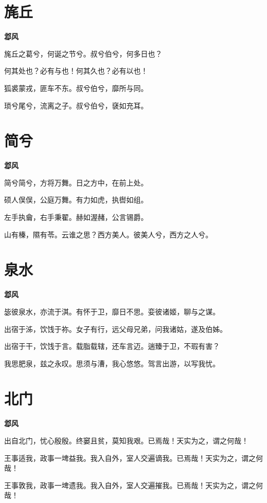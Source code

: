 \documentclass[12pt,a4paper]{ctexbook}
\begin{document}
\section{旄丘}
\textbf{邶风}\par\vspace{0.5em}
旄丘之葛兮，何诞之节兮。叔兮伯兮，何多日也？\par
何其处也？必有与也！何其久也？必有以也！\par
狐裘蒙戎，匪车不东。叔兮伯兮，靡所与同。\par
琐兮尾兮，流离之子。叔兮伯兮，褎如充耳。\par

\section{简兮}
\textbf{邶风}\par\vspace{0.5em}
简兮简兮，方将万舞。日之方中，在前上处。\par
硕人俣俣，公庭万舞。有力如虎，执辔如组。\par
左手执龠，右手秉翟。赫如渥赭，公言锡爵。\par
山有榛，隰有苓。云谁之思？西方美人。彼美人兮，西方之人兮。\par

\section{泉水}
\textbf{邶风}\par\vspace{0.5em}
毖彼泉水，亦流于淇。有怀于卫，靡日不思。娈彼诸姬，聊与之谋。\par
出宿于泲，饮饯于祢。女子有行，远父母兄弟，问我诸姑，遂及伯姊。\par
出宿于干，饮饯于言。载脂载辖，还车言迈。遄臻于卫，不瑕有害？\par
我思肥泉，兹之永叹。思须与漕，我心悠悠。驾言出游，以写我忧。\par

\section{北门}
\textbf{邶风}\par\vspace{0.5em}
出自北门，忧心殷殷。终窭且贫，莫知我艰。已焉哉！天实为之，谓之何哉！\par
王事适我，政事一埤益我。我入自外，室人交遍谪我。已焉哉！天实为之，谓之何哉！\par
王事敦我，政事一埤遗我。我入自外，室人交遍摧我。已焉哉！天实为之，谓之何哉！\par
\end{document}
